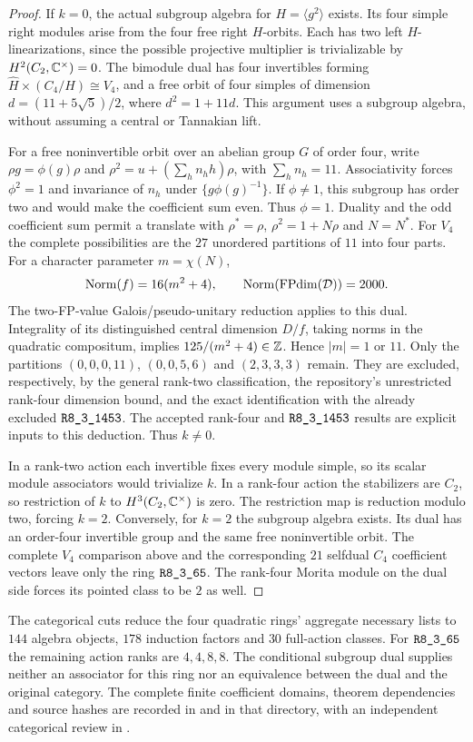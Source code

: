 \begin{proof}
If $k=0$, the actual subgroup algebra for $H=\langle g^2\rangle$ exists.
Its four simple right modules arise from the four free right $H$-orbits.
Each has two left $H$-linearizations, since the possible projective
multiplier is trivializable by $H^2(C_2,\mathbb C^\times)=0$.
The bimodule dual has four invertibles forming
$\widehat H\times(C_4/H)\cong V_4$, and a free orbit of four simples of
dimension $d=(11+5\sqrt5)/2$, where $d^2=1+11d$.
This argument uses a subgroup algebra, without assuming a central or
Tannakian lift.

For a free noninvertible orbit over an abelian group $G$ of order four,
write $\rho g=\phi(g)\rho$ and
$\rho^2=u+(\sum_h n_hh)\rho$, with $\sum_hn_h=11$.
Associativity forces $\phi^2=1$ and invariance of $n_h$ under
$\{g\phi(g)^{-1}\}$. If $\phi\ne1$, this subgroup has order two and would
make the coefficient sum even. Thus $\phi=1$.
Duality and the odd coefficient sum permit a translate with $\rho^*=\rho$,
$\rho^2=1+N\rho$ and $N=N^*$.
For $V_4$ the complete possibilities are the $27$ unordered partitions of
$11$ into four parts. For a character parameter $m=\chi(N)$,
\[
 \operatorname{Norm}(f)=16(m^2+4),\qquad
 \operatorname{Norm}(\operatorname{FPdim}(\mathcal D))=2000.
\]
The two-FP-value Galois/pseudo-unitary reduction applies to this dual.
Integrality of its distinguished central dimension $D/f$, taking norms in
the quadratic compositum, implies $125/(m^2+4)\in\mathbb Z$.
Hence $|m|=1$ or $11$. Only the partitions
$(0,0,0,11)$, $(0,0,5,6)$ and $(2,3,3,3)$ remain. They are excluded,
respectively, by the general rank-two classification, the repository's
unrestricted rank-four dimension bound, and the exact identification with
the already excluded $\sha{R8_3_1453}$.
The accepted rank-four and $\sha{R8_3_1453}$ results are explicit inputs to
this deduction. Thus $k\ne0$.

In a rank-two action each invertible fixes every module simple, so its
scalar module associators would trivialize $k$. In a rank-four action the
stabilizers are $C_2$, so restriction of $k$ to $H^3(C_2,\mathbb C^\times)$ is zero.
The restriction map is reduction modulo two, forcing $k=2$.
Conversely, for $k=2$ the subgroup algebra exists. Its dual has an
order-four invertible group and the same free noninvertible orbit.
The complete $V_4$ comparison above and the corresponding $21$ selfdual
$C_4$ coefficient vectors leave only the ring $\sha{R8_3_65}$.
The rank-four Morita module on the dual side forces its pointed class to
be $2$ as well.
\end{proof}
The categorical cuts reduce the four quadratic rings' aggregate necessary
lists to $144$ algebra objects, $178$ induction factors and $30$ full-action
classes. For $\sha{R8_3_65}$ the remaining action ranks are $4,4,8,8$.
The conditional subgroup dual supplies neither an associator for this ring
nor an equivalence between the dual and the original category.
The complete finite coefficient domains, theorem dependencies and source
hashes are recorded in
 and
 in that directory, with an independent categorical
review in
.

